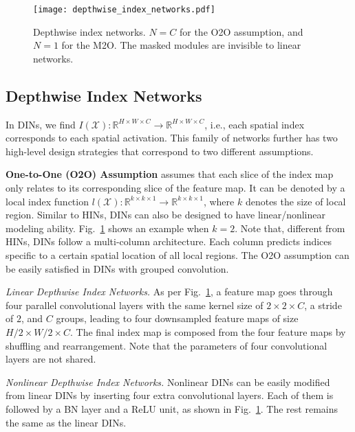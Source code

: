 \documentclass[10pt,twocolumn,letterpaper]{article}
\begin{document}
\begin{figure}[!tb]
	\captionsetup{font=small,singlelinecheck=true}
	\setlength{\abovecaptionskip}{10pt}
	\centering
	\texttt{[image: depthwise\_index\_networks.pdf]}\vspace{-8pt}
	\caption{Depthwise index networks. $N=C$ for the O2O assumption, and $N=1$ for the M2O. The masked modules are invisible to linear networks.}
	\label{fig:depthwise_networks}
\end{figure}



\subsection{Depthwise Index Networks}\label{subsec:depthwise_networks}

In DINs, we find $I(\mathcal{X}):\mathbb{R}^{H\times W\times C}\rightarrow\mathbb{R}^{H\times W \times C}$, i.e., each spatial index corresponds to each spatial activation. This family of networks further has two high-level design strategies that correspond to two different assumptions.

\vspace{3pt}
\noindent\textbf{One-to-One (O2O) Assumption} assumes that each slice of the index map only relates to its corresponding slice of the feature map. It can be denoted by a local index function $l(\mathcal{X}): \mathbb{R}^{k\times k\times1}\rightarrow\mathbb{R}^{k\times k\times1}$, where $k$ denotes the size of local region. Similar to HINs, DINs can also be designed to have linear/nonlinear modeling ability. Fig.~\ref{fig:depthwise_networks} shows an example when $k=2$. Note that, different from HINs, DINs follow a multi-column architecture. Each column predicts indices specific to a certain spatial location of all local regions. The O2O assumption can be easily satisfied in DINs with grouped convolution.

\vspace{3pt}
\noindent\textit{Linear Depthwise Index Networks.}  As per Fig.~\ref{fig:depthwise_networks}, a feature map goes through four parallel convolutional layers with the same kernel size of $2\times2\times C$, a stride of $2$, and $C$ groups, leading to four downsampled feature maps of size $H/2\times W/2 \times C$. The final index map is composed from the four feature maps by shuffling and rearrangement. Note that the parameters of four convolutional layers are not shared.

\vspace{3pt}
\noindent\textit{Nonlinear Depthwise Index Networks.} Nonlinear DINs can be easily modified from linear DINs by inserting four extra convolutional layers. Each of them is followed by a BN layer and a ReLU unit, as shown in Fig.~\ref{fig:depthwise_networks}. The rest remains the same as the linear DINs.
\end{document}

